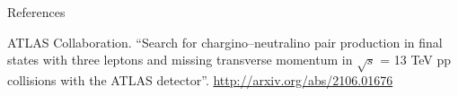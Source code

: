 \documentclass[UKenglish]{beamer}
\begin{document}
\begin{frame}[allowframebreaks]{References}
    \begin{thebibliography}{}

        ATLAS Collaboration.
        \newblock \enquote{Search for chargino--neutralino pair production in final states with three leptons and missing transverse momentum in {$\sqrt{s}$} = 13 {TeV} pp collisions with the {ATLAS} detector}.
        \newblock \url{http://arxiv.org/abs/2106.01676}


    \end{thebibliography}
\end{frame}
\end{document}
